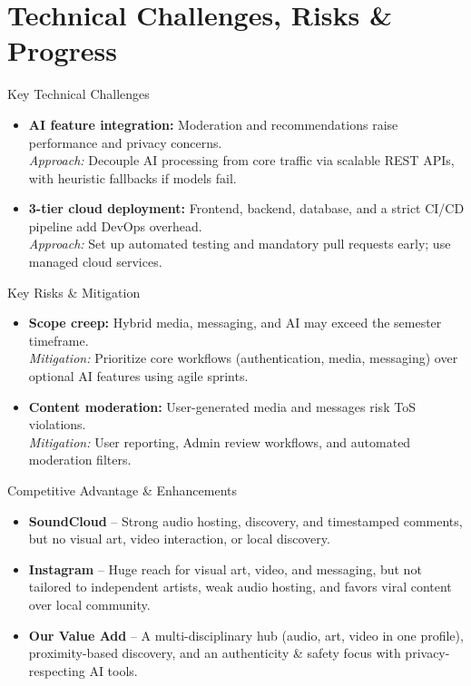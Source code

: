 \documentclass[11pt,aspectratio=169]{beamer}
\begin{document}
\section{Technical Challenges, Risks \& Progress}

\begin{frame}{Key Technical Challenges}
\begin{itemize}
  \item \textbf{AI feature integration:} Moderation and recommendations raise performance and privacy concerns. \\
  \textit{Approach:} Decouple AI processing from core traffic via scalable REST APIs, with heuristic fallbacks if models fail.
  \item \textbf{3-tier cloud deployment:} Frontend, backend, database, and a strict CI/CD pipeline add DevOps overhead. \\
  \textit{Approach:} Set up automated testing and mandatory pull requests early; use managed cloud services.
\end{itemize}
\end{frame}

\begin{frame}{Key Risks \& Mitigation}
\begin{itemize}
  \item \textbf{Scope creep:} Hybrid media, messaging, and AI may exceed the semester timeframe. \\
  \textit{Mitigation:} Prioritize core workflows (authentication, media, messaging) over optional AI features using agile sprints.
  \item \textbf{Content moderation:} User-generated media and messages risk ToS violations. \\
  \textit{Mitigation:} User reporting, Admin review workflows, and automated moderation filters.
\end{itemize}
\end{frame}

\begin{frame}{Competitive Advantage \& Enhancements}
\begin{itemize}
  \item \textbf{SoundCloud} -- Strong audio hosting, discovery, and timestamped comments, but no visual art, video interaction, or local discovery.
  \item \textbf{Instagram} -- Huge reach for visual art, video, and messaging, but not tailored to independent artists, weak audio hosting, and favors viral content over local community.
  \item \textbf{Our Value Add} -- A multi-disciplinary hub (audio, art, video in one profile), proximity-based discovery, and an authenticity \& safety focus with privacy-respecting AI tools.
\end{itemize}
\end{frame}
\end{document}

